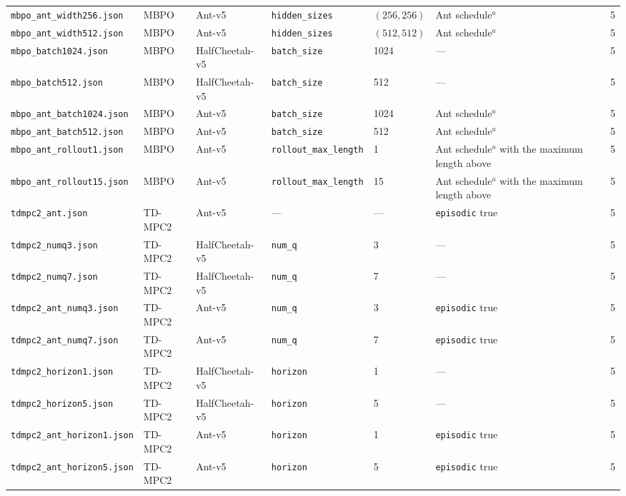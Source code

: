 {\begin{longtable}{@{}p{3.1cm}lp{1.9cm}p{2.3cm}lp{2.4cm}r@{}}
    \texttt{mbpo\_\allowbreak ant\_\allowbreak width256.json} & MBPO & Ant-v5 & \texttt{hidden\_\allowbreak sizes} & $(256,256)$ & Ant schedule$^{a}$ & \num{5} \\
    \texttt{mbpo\_\allowbreak ant\_\allowbreak width512.json} & MBPO & Ant-v5 & \texttt{hidden\_\allowbreak sizes} & $(512,512)$ & Ant schedule$^{a}$ & \num{5} \\
    \texttt{mbpo\_\allowbreak batch1024.json} & MBPO & HalfCheetah-v5 & \texttt{batch\_\allowbreak size} & 1024 & --- & \num{5} \\
    \texttt{mbpo\_\allowbreak batch512.json} & MBPO & HalfCheetah-v5 & \texttt{batch\_\allowbreak size} & 512 & --- & \num{5} \\
    \texttt{mbpo\_\allowbreak ant\_\allowbreak batch1024.json} & MBPO & Ant-v5 & \texttt{batch\_\allowbreak size} & 1024 & Ant schedule$^{a}$ & \num{5} \\
    \texttt{mbpo\_\allowbreak ant\_\allowbreak batch512.json} & MBPO & Ant-v5 & \texttt{batch\_\allowbreak size} & 512 & Ant schedule$^{a}$ & \num{5} \\
    \texttt{mbpo\_\allowbreak ant\_\allowbreak rollout1.json} & MBPO & Ant-v5 & \texttt{rollout\_\allowbreak max\_\allowbreak length} & 1 & Ant schedule$^{a}$ with the maximum length above & \num{5} \\
    \texttt{mbpo\_\allowbreak ant\_\allowbreak rollout15.json} & MBPO & Ant-v5 & \texttt{rollout\_\allowbreak max\_\allowbreak length} & 15 & Ant schedule$^{a}$ with the maximum length above & \num{5} \\
    \texttt{tdmpc2\_\allowbreak ant.json} & TD-MPC2 & Ant-v5 & --- & --- & \texttt{episodic} true & \num{5} \\
    \texttt{tdmpc2\_\allowbreak numq3.json} & TD-MPC2 & HalfCheetah-v5 & \texttt{num\_\allowbreak q} & 3 & --- & \num{5} \\
    \texttt{tdmpc2\_\allowbreak numq7.json} & TD-MPC2 & HalfCheetah-v5 & \texttt{num\_\allowbreak q} & 7 & --- & \num{5} \\
    \texttt{tdmpc2\_\allowbreak ant\_\allowbreak numq3.json} & TD-MPC2 & Ant-v5 & \texttt{num\_\allowbreak q} & 3 & \texttt{episodic} true & \num{5} \\
    \texttt{tdmpc2\_\allowbreak ant\_\allowbreak numq7.json} & TD-MPC2 & Ant-v5 & \texttt{num\_\allowbreak q} & 7 & \texttt{episodic} true & \num{5} \\
    \texttt{tdmpc2\_\allowbreak horizon1.json} & TD-MPC2 & HalfCheetah-v5 & \texttt{horizon} & 1 & --- & \num{5} \\
    \texttt{tdmpc2\_\allowbreak horizon5.json} & TD-MPC2 & HalfCheetah-v5 & \texttt{horizon} & 5 & --- & \num{5} \\
    \texttt{tdmpc2\_\allowbreak ant\_\allowbreak horizon1.json} & TD-MPC2 & Ant-v5 & \texttt{horizon} & 1 & \texttt{episodic} true & \num{5} \\
    \texttt{tdmpc2\_\allowbreak ant\_\allowbreak horizon5.json} & TD-MPC2 & Ant-v5 & \texttt{horizon} & 5 & \texttt{episodic} true & \num{5} \\
  \end{longtable}
}

